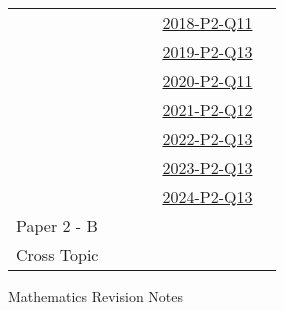 \documentclass[12pt, a4paper]{article}
\begin{document}
\begin{absolutelynopagebreak}
\begin{center}
\begin{tabular}{|l|c|c|c|c|c|}
&  &  &  & \hyperref[DSE2018-CoreP2-Q11]{2018-P2-Q11} &  \\
&  &  &  & \hyperref[DSE2019-CoreP2-Q13]{2019-P2-Q13} &  \\
&  &  &  & \hyperref[DSE2020-CoreP2-Q11]{2020-P2-Q11} &  \\
&  &  &  & \hyperref[DSE2021-CoreP2-Q12]{2021-P2-Q12} &  \\
&  &  &  & \hyperref[DSE2022-CoreP2-Q13]{2022-P2-Q13} &  \\
&  &  &  & \hyperref[DSE2023-CoreP2-Q13]{2023-P2-Q13} &  \\
&  &  &  & \hyperref[DSE2024-CoreP2-Q13]{2024-P2-Q13} &  \\
\hline
Paper 2 - B&  &  &  &  &  \\
\hline
\hline
Cross Topic&  &  &  &  &  \\
\hline
\end{tabular}
\end{center}
\end{absolutelynopagebreak}
\newpage
\newpage
\thispagestyle{empty}
\begin{center}
Mathematics Revision Notes\\\vspace{1cm}
\\\vspace{1cm}
{\fontsize{24pt}{24pt}\selectfont {More about Trigonometry}} \\\vspace{1cm}
\label{chapter:S4-10}

\end{center}
\vspace{0.5cm}
\hline
\end{document}

